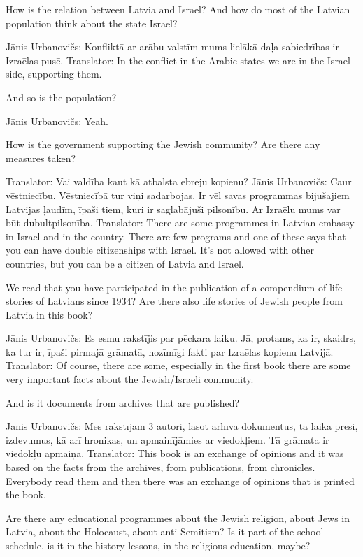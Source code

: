 How is the relation between Latvia and Israel? And how do most of the Latvian population think about the state Israel? 

Jānis Urbanovičs: Konfliktā ar arābu valstīm mums lielākā daļa sabiedrības ir Izraēlas pusē.  
Translator: In the conflict in the Arabic states we are in the Israel side, supporting them.  

And so is the population? 

Jānis Urbanovičs: Yeah. 

How is the government supporting the Jewish community? Are there any measures taken? 

Translator: Vai valdība kaut kā atbalsta ebreju kopienu? 
Jānis Urbanovičs: Caur vēstniecību. Vēstniecībā tur viņi sadarbojas. Ir vēl savas programmas bijušajiem Latvijas ļaudīm, īpaši tiem, kuri ir saglabājuši pilsonību. Ar Izraēlu mums var būt dubultpilsonība. Translator: There are some programmes in Latvian embassy in Israel and in the country. There are few programs and one of these says that you can have double citizenships with Israel. It’s not allowed with other countries, but you can be a citizen of Latvia and Israel.  

We read that you have participated in the publication of a compendium of life stories of Latvians since 1934? Are there also life stories of Jewish people from Latvia in this book?  

Jānis Urbanovičs: Es esmu rakstījis par pēckara laiku. Jā, protams, ka ir, skaidrs, ka tur ir, īpaši pirmajā grāmatā, nozīmīgi fakti par Izraēlas kopienu Latvijā.  
Translator: Of course, there are some, especially in the first book there are some very important facts about the Jewish/Israeli community.  

And is it documents from archives that are published?  

Jānis Urbanovičs: Mēs rakstījām 3 autori, lasot arhīva dokumentus, tā laika presi, izdevumus, kā arī hronikas, un apmainījāmies ar viedokļiem. Tā grāmata ir viedokļu apmaiņa.  
Translator: This book is an exchange of opinions and it was based on the facts from the archives, from publications, from chronicles. Everybody read them and then there was an exchange of opinions that is printed the book. 

Are there any educational programmes about the Jewish religion, about Jews in Latvia, about the Holocaust, about anti-Semitism? Is it part of the school schedule, is it in the history lessons, in the religious education, maybe?  


